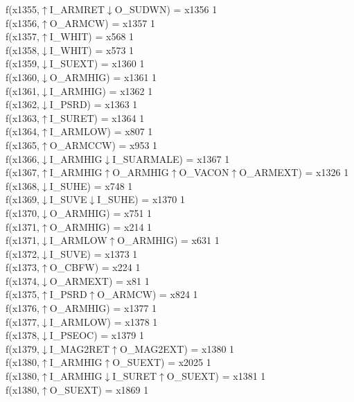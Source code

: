 f(x1355,$\uparrow$I\_ARMRET$\downarrow$O\_SUDWN) = x1356 {1} \\
f(x1356,$\uparrow$O\_ARMCW) = x1357 {1} \\
f(x1357,$\uparrow$I\_WHIT) = x568 {1} \\
f(x1358,$\downarrow$I\_WHIT) = x573 {1} \\
f(x1359,$\downarrow$I\_SUEXT) = x1360 {1} \\
f(x1360,$\downarrow$O\_ARMHIG) = x1361 {1} \\
f(x1361,$\downarrow$I\_ARMHIG) = x1362 {1} \\
f(x1362,$\downarrow$I\_PSRD) = x1363 {1} \\
f(x1363,$\uparrow$I\_SURET) = x1364 {1} \\
f(x1364,$\uparrow$I\_ARMLOW) = x807 {1} \\
f(x1365,$\uparrow$O\_ARMCCW) = x953 {1} \\
f(x1366,$\downarrow$I\_ARMHIG$\downarrow$I\_SUARMALE) = x1367 {1} \\
f(x1367,$\uparrow$I\_ARMHIG$\uparrow$O\_ARMHIG$\uparrow$O\_VACON$\uparrow$O\_ARMEXT) = x1326 {1} \\
f(x1368,$\downarrow$I\_SUHE) = x748 {1} \\
f(x1369,$\downarrow$I\_SUVE$\downarrow$I\_SUHE) = x1370 {1} \\
f(x1370,$\downarrow$O\_ARMHIG) = x751 {1} \\
f(x1371,$\uparrow$O\_ARMHIG) = x214 {1} \\
f(x1371,$\downarrow$I\_ARMLOW$\uparrow$O\_ARMHIG) = x631 {1} \\
f(x1372,$\downarrow$I\_SUVE) = x1373 {1} \\
f(x1373,$\uparrow$O\_CBFW) = x224 {1} \\
f(x1374,$\downarrow$O\_ARMEXT) = x81 {1} \\
f(x1375,$\uparrow$I\_PSRD$\uparrow$O\_ARMCW) = x824 {1} \\
f(x1376,$\uparrow$O\_ARMHIG) = x1377 {1} \\
f(x1377,$\downarrow$I\_ARMLOW) = x1378 {1} \\
f(x1378,$\downarrow$I\_PSEOC) = x1379 {1} \\
f(x1379,$\downarrow$I\_MAG2RET$\uparrow$O\_MAG2EXT) = x1380 {1} \\
f(x1380,$\uparrow$I\_ARMHIG$\uparrow$O\_SUEXT) = x2025 {1} \\
f(x1380,$\uparrow$I\_ARMHIG$\downarrow$I\_SURET$\uparrow$O\_SUEXT) = x1381 {1} \\
f(x1380,$\uparrow$O\_SUEXT) = x1869 {1} \\
